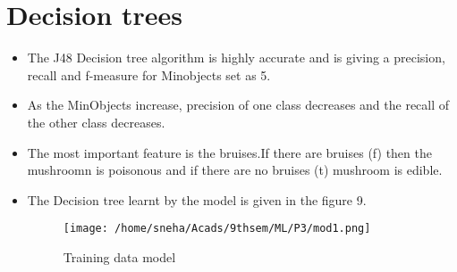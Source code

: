 \documentclass[12pt]{article}
\begin{document}
\section{Decision trees}
\begin{itemize}
\item{
The J48 Decision tree algorithm is highly accurate and is giving a precision, recall and f-measure for Minobjects set as 5. 

}
\item{
As the MinObjects increase, precision of one class decreases and the recall of the other class decreases.


}
\item {
The most important feature is the bruises.If there are bruises (f) then the mushroomn is poisonous and if there are no bruises (t) mushroom is edible.
}

\item{ The Decision tree learnt by the model is given in the figure 9.
\begin{figure}
	\centering
		\texttt{[image: /home/sneha/Acads/9thsem/ML/P3/mod1.png]}
	\caption{Training data model	}
	
\end{figure}

}
\end{itemize}















 
\end{document}
